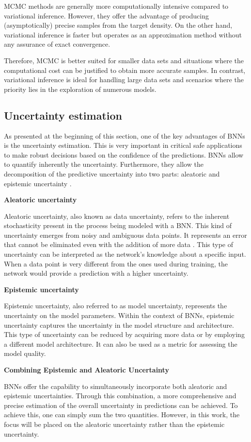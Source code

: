 MCMC methods are generally more computationally intensive compared to variational inference. However, they offer the advantage of producing (asymptotically) precise samples from the target density. On the other hand, variational inference is faster but operates as an approximation method without any assurance of exact convergence.

Therefore, MCMC is better suited for smaller data sets and situations where the computational cost can be justified to obtain more accurate samples. In contrast, variational inference is ideal for handling large data sets and scenarios where the priority lies in the exploration of numerous models.

\subsection{Uncertainty estimation}

As presented at the beginning of this section, one of the key advantages of BNNs is the uncertainty estimation. This is very important in critical safe applications to make robust decisions based on the confidence of the predictions. BNNs allow to quantify inherently the uncertainty. Furthermore, they allow the decomposition of the predictive uncertainty into two parts: aleatoric and epistemic uncertainty \cite{Mitros2019OnTV}.

\vspace{0.2cm}
\textbf{Aleatoric uncertainty}

Aleatoric uncertainty, also known as data uncertainty, refers to the inherent stochasticity present in the process being modeled with a BNN. This kind of uncertainty emerges from noisy and ambiguous data points. It represents an error that cannot be eliminated even with the addition of more data \cite{article01}. This type of uncertainty can be interpreted as the network's knowledge about a specific input. When a data point is very different from the ones used during training, the network would provide a prediction with a higher uncertainty.

\vspace{0.2cm}
\textbf{Epistemic uncertainty}

Epistemic uncertainty, also referred to as model uncertainty, represents the uncertainty on the model parameters. Within the context of BNNs, epistemic uncertainty captures the uncertainty in the model structure and architecture. This type of uncertainty can be reduced by acquiring more data or by employing a different model architecture. It can also be used as a metric for assessing the model quality.

\vspace{0.2cm}
\textbf{Combining Epistemic and Aleatoric Uncertainty}

BNNs offer the capability to simultaneously incorporate both aleatoric and epistemic uncertainties. Through this combination, a more comprehensive and precise estimation of the overall uncertainty in predictions can be achieved. To achieve this, one can simply sum the two quantities. However, in this work, the focus will be placed on the aleatoric uncertainty rather than the epistemic uncertainty.